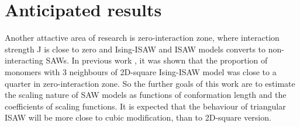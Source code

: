 \section{Anticipated results}
\label{sec:antres}
Another attactive area of research is zero-interaction zone, where interaction strength J is close to zero and Ising-ISAW and ISAW models converts to non-interacting SAWs.
In previous work \cite{faizullina2021critical}, it was shown that the proportion of monomers with 3 neighbours of 2D-square Ising-ISAW model was close to a quarter in zero-interaction zone.
So the further goals of this work are to estimate the scaling nature of SAW models as functions of conformation length and the coefficients of scaling functions.
It is expected that the behaviour of triangular ISAW will be more close to cubic modification, than to 2D-square version. 
